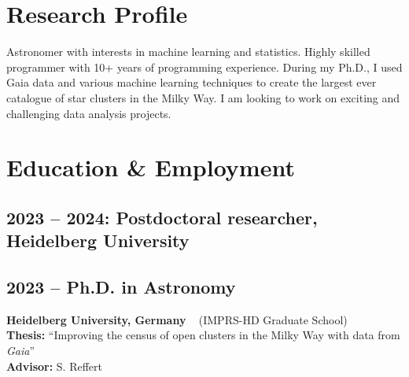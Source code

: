 \documentclass[12pt, letterpaper]{hunt-cv}
\begin{document}
\thispagestyle{plain}  %

\cvTitle

\section*{Research Profile}

Astronomer with interests in machine learning and statistics. Highly skilled programmer with 10+ years of programming experience. During my Ph.D., I used Gaia data and various machine learning techniques to create the largest ever catalogue of star clusters in the Milky Way. I am looking to work on exciting and challenging data analysis projects.






\section*{Education \& Employment}

\subsection*{2023 -- 2024: Postdoctoral researcher, Heidelberg University}\vspace{0.3cm}

\subsection*{2023 -- Ph.D. in Astronomy}
\begin{addmargin}[1em]{0em}
    \textbf{Heidelberg University, Germany} ~ (IMPRS-HD Graduate School)\\
    \textbf{Thesis:} ``Improving the census of open clusters in the Milky Way with data from \emph{Gaia}''\\
    \textbf{Advisor:} S. Reffert
\end{addmargin}
\end{document}

